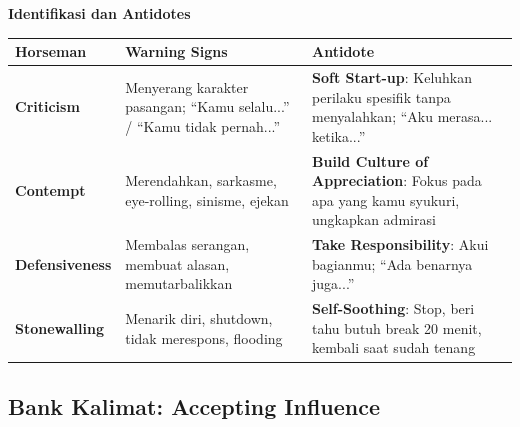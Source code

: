\begin{warningbox}
\textbf{Identifikasi dan Antidotes}

\begin{center}
\renewcommand{\arraystretch}{1.6}
\begin{tabular}{|>{\raggedright}p{3cm}|>{\raggedright}p{5cm}|>{\raggedright\arraybackslash}p{6cm}|}
\hline
\rowcolor{accent!20}
\textbf{Horseman} & \textbf{Warning Signs} & \textbf{Antidote} \\
\hline
\textbf{Criticism} & Menyerang karakter pasangan; ``Kamu selalu...'' / ``Kamu tidak pernah...'' & \textbf{Soft Start-up}: Keluhkan perilaku spesifik tanpa menyalahkan; ``Aku merasa... ketika...'' \\
\hline
\textbf{Contempt} & Merendahkan, sarkasme, eye-rolling, sinisme, ejekan & \textbf{Build Culture of Appreciation}: Fokus pada apa yang kamu syukuri, ungkapkan admirasi \\
\hline
\textbf{Defensiveness} & Membalas serangan, membuat alasan, memutarbalikkan & \textbf{Take Responsibility}: Akui bagianmu; ``Ada benarnya juga...'' \\
\hline
\textbf{Stonewalling} & Menarik diri, shutdown, tidak merespons, flooding & \textbf{Self-Soothing}: Stop, beri tahu butuh break 20 menit, kembali saat sudah tenang \\
\hline
\end{tabular}
\end{center}
\end{warningbox}

\subsection{Bank Kalimat: Accepting Influence}

